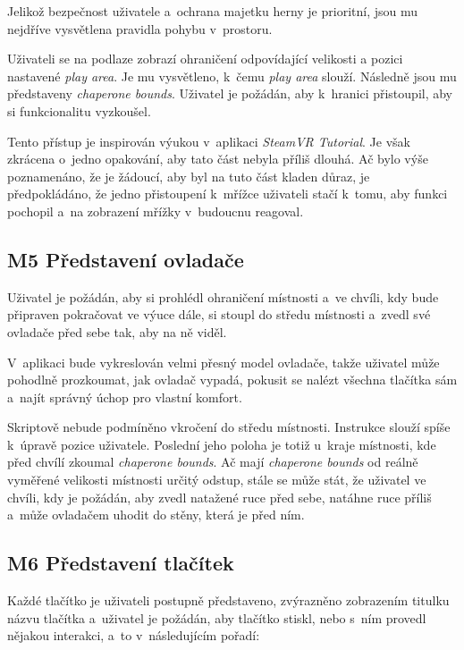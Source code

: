 Jelikož bezpečnost uživatele a~ochrana majetku herny je prioritní, jsou mu nejdříve
vysvětlena pravidla pohybu v~prostoru.

Uživateli se na podlaze zobrazí ohraničení odpovídající velikosti a
pozici nastavené \emph{play area}. Je mu vysvětleno, k~čemu \emph{play
area} slouží. Následně jsou mu představeny \emph{chaperone bounds}.
Uživatel je požádán, aby k~hranici přistoupil, aby si funkcionalitu
vyzkoušel.

Tento přístup je inspirován výukou v~aplikaci \emph{SteamVR
Tutorial}. Je však zkrácena o~jedno opakování, aby tato část nebyla
příliš dlouhá. Ač bylo výše poznamenáno, že je žádoucí, aby byl na tuto
část kladen důraz, je předpokládáno, že jedno přistoupení k~mřížce uživateli
stačí k~tomu, aby funkci pochopil a~na zobrazení mřížky v~budoucnu
reagoval.

\subsection{M5 Představení
ovladače}\label{m5-pux159edstavenuxed-ovladaux10de}

Uživatel je požádán, aby si prohlédl ohraničení místnosti a~ve chvíli,
kdy bude připraven pokračovat ve výuce dále, si stoupl do středu
místnosti a~zvedl své ovladače před sebe tak, aby na ně viděl.

V~aplikaci bude vykreslován velmi přesný model ovladače, takže uživatel
může pohodlně prozkoumat, jak ovladač vypadá, pokusit se nalézt všechna
tlačítka sám a~najít správný úchop pro vlastní komfort.

Skriptově nebude podmíněno vkročení do středu místnosti.
Instrukce slouží spíše k~úpravě pozice uživatele. Poslední jeho poloha
je totiž u~kraje místnosti, kde před chvílí zkoumal \emph{chaperone
bounds}. Ač mají \emph{chaperone bounds} od reálně vyměřené velikosti místnosti
určitý odstup, stále se může stát, že uživatel ve chvíli, kdy je
požádán, aby zvedl natažené ruce před sebe, natáhne ruce příliš a~může
ovladačem uhodit do stěny, která je před ním.

\subsection{M6 Představení
tlačítek}\label{m6-pux159edstavenuxed-tlaux10duxedtek}

Každé tlačítko je uživateli postupně představeno, zvýrazněno zobrazením
titulku názvu tlačítka a~uživatel je požádán, aby tlačítko stiskl, nebo s~ním
provedl nějakou interakci, a~to v~následujícím pořadí:

